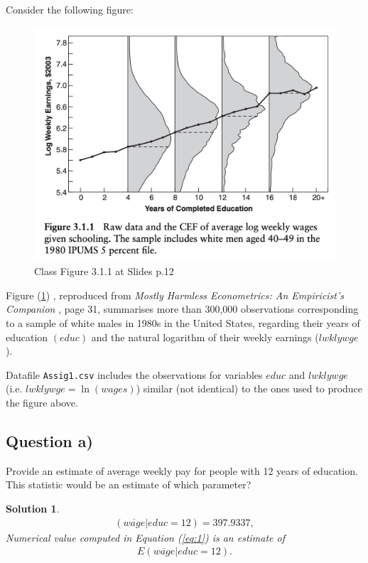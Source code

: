 \documentclass[9pt]{tufte-handout}
\newcommand{\problem}[1]{{\color{gray} #1}}
\newcommand{\solution}[1]{{\color{NavyBlue} #1}}
\newcommand{\qedblack}{\hfill \blacksquare}
\newtheorem*{Solution}{Solution}
\begin{document}
Consider the following figure:\\
\begin{figure}[h]
	\includegraphics[scale = 0.6]{classfig.png}
	\caption{Class Figure 3.1.1 at Slides p.12}
	\label{fig:1}
\end{figure}
Figure (\ref{fig:1}) , reproduced from \textit{Mostly Harmless Econometrics: An Empiricist's Companion}\citep{harmless} , page 31, summarises more than 300,000 observations corresponding to a sample of white males in 1980s in the United States, regarding their years of education $(educ)$ and the natural logarithm of their weekly earnings ($lwklywge$). \par 
Datafile \texttt{Assig1.csv} includes the observations for variables $educ$ and $lwklywge$ (i.e. $lwklywge =\ln (w a g e s)$) similar (not identical) to the ones used to produce the figure above.

\subsection{Question a)}
\problem{Provide an estimate of average weekly pay for people with 12 years of education. This statistic would be an estimate of which parameter?
}

\solution{\begin{Solution}
	\normalfont
	\begin{align*}
		(\overline{wage} \vert educ=12) = 397.9337, \tag{a.1} \label{eq:1}
	\end{align*}
	Numerical value computed in Equation (\ref{eq:1}) is an estimate of
	\begin{align*}
		E(\overline{wage} \vert educ=12).
	\end{align*}
	\qedblack
\end{Solution}
}
\end{document}
